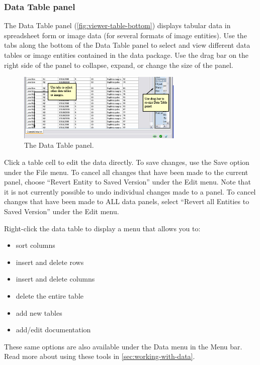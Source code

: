 \subsubsection{Data Table panel} \label{sec:panel-table}

The Data Table panel (\autoref{fig:viewer-table-bottom}) displays
tabular data in spreadsheet form or image data (for several formats of
image entities). Use the tabs along the bottom of the Data Table panel
to select and view different data tables or image entities contained in
the data package. Use the drag bar on the right side of the panel to
collapse, expand, or change the size of the panel.

\begin{figure}
  \centering
    \includegraphics[width=0.7\textwidth]{images/viewer-table-bottom.jpg}
  \caption{The Data Table panel.}
  \label{fig:viewer-table-bottom}
\end{figure}

Click a table cell to edit the data directly. To save changes, use the
Save option under the File menu. To cancel all changes that have been
made to the current panel, choose ``Revert Entity to Saved Version'' under
the Edit menu. Note that it is not currently possible to undo individual
changes made to a panel. To cancel changes that have been made to ALL
data panels, select ``Revert all Entities to Saved Version'' under the
Edit menu.

Right-click the data table to display a menu that allows you to:
\begin{itemize}
  \setlength{\parskip}{1pt}
  \item sort columns 
  \item insert and delete rows 
  \item insert and delete columns 
  \item delete the entire table
  \item add new tables 
  \item add/edit documentation 
\end{itemize}

These same options are also available under the Data menu in the Menu
bar. Read more about using these tools in \autoref{sec:working-with-data}.

